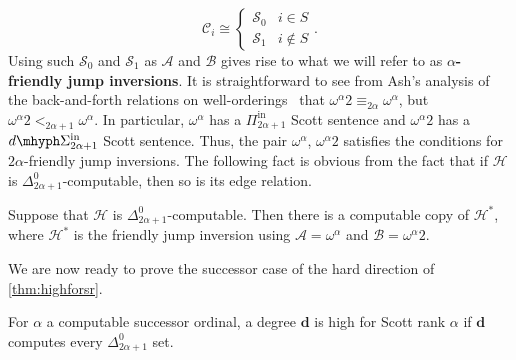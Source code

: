 \documentclass{amsart}
\newcommand\+[1]{\mathcal{#1}}
\renewcommand\*[1]{\mathbf{#1}}
\renewcommand\=[1]{\text{#1}}
\renewcommand\*[1]{\mathbf{#1}}
\newcommand{\Pinf}[1]{\Pi^{\mathrm{in}}_{#1}}
\newcommand{\dSinf}[1]{d\mhyph\Sigma^{\mathrm{in}}_{#1}}
\newcommand{\define}[1]{\textbf{#1}}
\begin{document}
       \[ \+C_i\cong \begin{cases} \+S_0 & i\in S\\
                                   \+S_1 & i\not\in S
   \end{cases}.\]
   Using such $\+S_0$ and $\+S_1$ as $\+A$ and $\+B$ gives rise to what we will refer to as \define{$\alpha$-friendly jump inversions}.
   It is straightforward to see from Ash's analysis of the back-and-forth relations on well-orderings~\cite{ash1986} that $\omega^\alpha2 \equiv_{2\alpha} \omega^\alpha$, but $\omega^\alpha2<_{2\alpha+1}\omega^\alpha $. In particular, $\omega^\alpha$ has a $\Pinf{2\alpha+1}$ Scott sentence and $\omega^\alpha2$ has a $\dSinf{2\alpha+1}$ Scott sentence. Thus, the pair $\omega^\alpha$, $\omega^\alpha2$ satisfies the conditions for $2\alpha$-friendly jump inversions. The following fact is obvious from the fact that if $\+H$ is $\Delta^0_{2\alpha+1}$-computable, then so is its edge relation.
   \begin{lemma}\label{claim:jumpinversion}
     Suppose that $\+H$ is $\Delta^0_{2\alpha+1}$-computable. Then there is a computable copy of $\+H^*$, where $\+H^*$ is the friendly jump inversion using $\+A=\omega^\alpha$ and $\+B=\omega^\alpha2$.
   \end{lemma}
   We are now ready to prove the successor case of the hard direction of \cref{thm:highforsr}.
 \begin{lemma}\label{lem:highforsrsucc}
   For $\alpha$ a computable successor ordinal, a degree $\*d$ is high for Scott rank $\alpha$ if $\*d$ computes every $\Delta^0_{2\alpha+1}$ set.
 \end{lemma}
\end{document}
